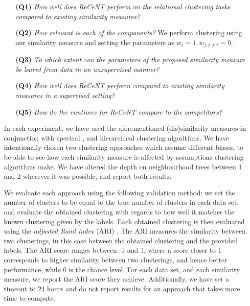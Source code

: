 \begin{itemize}
    \item[\textbf{(Q1)}]\textit{How well does ReCeNT perform on the relational clustering tasks compared to existing similarity measures?}

    \item[\textbf{(Q2)}] \textit{How relevant is each of the components?}  We perform clustering using our similarity measure and setting the parameters as $w_i = 1, w_{j, j \not=i}=0$.

    \item[\textbf{(Q3)}] \textit{To which extent can the parameters of the proposed similarity measure  be learnt from data in an unsupervised manner?}

    \item[\textbf{(Q4)}] \textit{How well does ReCeNT perform compared to existing similarity measures in a supervised setting?}

    \item[\textbf{(Q5)}] \textit{How do the runtimes for ReCeNT compare to the competitors?}
\end{itemize}








In each experiment, we have used the aforementioned (dis)similarity measures in conjunction with spectral \cite{Spectral},  and hierarchical \cite{Agglomerative} clustering algorithms.
We have intentionally chosen two clustering approaches which assume different biases, to be able to see how each similarity measure is affected by assumptions clustering algorithms make.
We have altered the depth on neighbourhood trees between 1 and 2 wherever it was possible, and report both results.




We evaluate each approach using the following validation method: we set the number of clusters to be equal to the true number of clusters in each data set, and evaluate the obtained clustering with regards to how well it matches the known clustering given by the labels.
Each obtained clustering is then evaluated using the \textit{adjusted Rand index} (ARI)  \cite{Rand71,MoreyARI}.
The ARI measures the similarity between two clusterings, in this case between the obtained clustering and the provided labels.
The ARI score ranges between -1 and 1, where a score closer to 1 corresponds to higher similarity between two clusterings, and hence better performance, while 0 is the chance level.
For each data set, and each similarity measure, we report the ARI score they achieve.
Additionally, we have set a timeout to 24 hours and do not report results for an approach that takes more time to compute.





